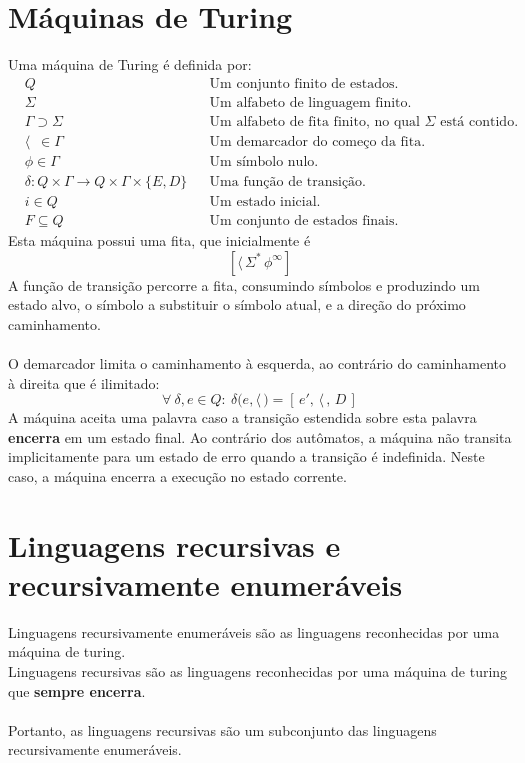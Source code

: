 \documentclass[11pt]{article}
\begin{document}
\section{Máquinas de Turing}
\label{sec:orge9b7bba}
Uma máquina de Turing é definida por:
\begin{align*}
  & Q && \text{Um conjunto finito de estados.} \\
  & \Sigma && \text{Um alfabeto de linguagem finito.} \\
  & \Gamma \supset \Sigma && \text{Um alfabeto de fita finito, no qual $\Sigma$ está contido.} \\
  & \langle \enspace \in \Gamma && \text{Um demarcador do começo da fita.} \\
  & \phi \in \Gamma && \text{Um símbolo nulo.} \\
  & \delta: Q \times \Gamma \to Q \times \Gamma \times \{E, D\} && \text{Uma função de transição.} \\
  & i \in Q && \text{Um estado inicial.} \\
  & F \subseteq Q && \text{Um conjunto de estados finais.}
\end{align*}
Esta máquina possui uma fita, que inicialmente é
\[
  \left[\langle\,\Sigma^*\,\phi^\infty\right]
\]
A função de transição percorre a fita, consumindo símbolos e produzindo um estado alvo,
o símbolo a substituir o símbolo atual, e a direção do próximo
caminhamento. \\ \\
O demarcador limita o caminhamento à esquerda, ao contrário do caminhamento à direita
que é ilimitado:
\[
  \forall\> \delta, e \in Q: \>\delta\big(e, \langle\,\big) = \left[\,e',\, \langle\,,\, D\,\right]
\]
A máquina aceita uma palavra caso a transição estendida sobre esta palavra \textbf{encerra} em um
estado final. Ao contrário dos autômatos, a máquina não transita implicitamente para um
estado de erro quando a transição é indefinida. Neste caso, a máquina encerra a
execução no estado corrente.
\section{Linguagens recursivas e recursivamente enumeráveis}
\label{sec:org08ca83d}
Linguagens recursivamente enumeráveis são as linguagens reconhecidas por uma máquina de
turing. \\
Linguagens recursivas são as linguagens reconhecidas por uma máquina de turing que
\textbf{sempre encerra}. \\ \\
Portanto, as linguagens recursivas são um subconjunto das linguagens recursivamente
enumeráveis.
\end{document}
